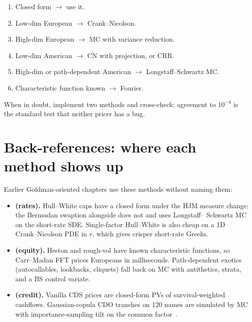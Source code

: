 \begin{keyfactbox}
\begin{enumerate}
  \item Closed form $\to$ use it.
  \item Low-dim European $\to$ Crank--Nicolson.
  \item High-dim European $\to$ MC with variance reduction.
  \item Low-dim American $\to$ CN with projection, or CRR.
  \item High-dim or path-dependent American $\to$
    Longstaff--Schwartz MC.
  \item Characteristic function known $\to$ Fourier.
\end{enumerate}
When in doubt, implement two methods and cross-check: agreement to
$10^{-4}$ is the standard test that neither pricer has a bug.
\end{keyfactbox}


\section{Back-references: where each method shows up}
\label{sec:method_backrefs}

Earlier Goldman-oriented chapters use these methods without naming
them:

\begin{itemize}
  \item \textbf{ (rates).}
    Hull--White caps have a closed form under the HJM measure change;
    the Bermudan swaption alongside does not and uses Longstaff--
    Schwartz MC on the short-rate SDE.  Single-factor Hull--White is
    also cheap on a 1D Crank--Nicolson PDE in $r$, which gives
    crisper short-rate Greeks.
  \item \textbf{ (equity).}
    Heston and rough-vol have known characteristic functions, so
    Carr--Madan FFT prices Europeans in milliseconds.  Path-dependent
    exotics (autocallables, lookbacks, cliquets) fall back on MC with
    antithetics, strata, and a BS control variate.
  \item \textbf{ (credit).}
    Vanilla CDS prices are closed-form PVs of survival-weighted
    cashflows.  Gaussian-copula CDO tranches on 120 names are
    simulated by MC with importance-sampling tilt on the common
    factor~\citeGlasserman.
\end{itemize}

